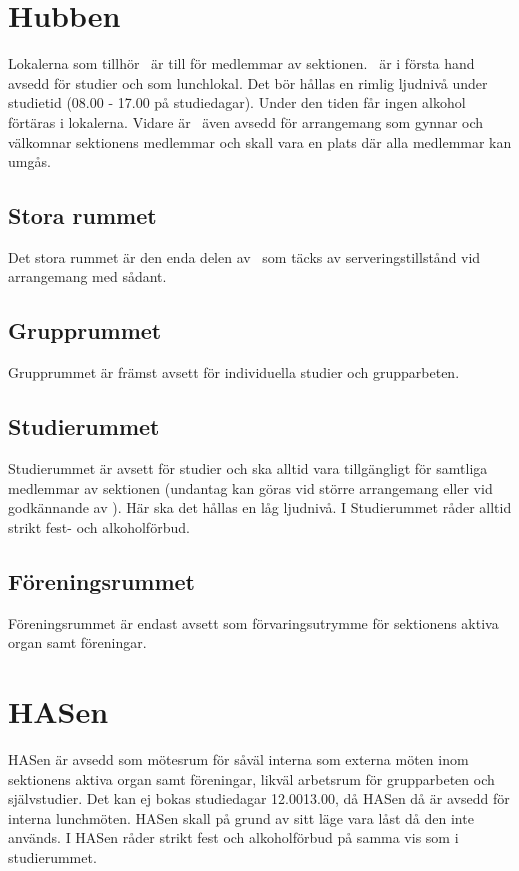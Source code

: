 \documentclass[11pt, includeaddress]{classes/cthit}
\begin{document}
\section{Hubben}
Lokalerna som tillhör \HUBBEN\ är till för medlemmar av sektionen. \HUBBEN\ är i första hand avsedd för
studier och som lunchlokal. Det bör hållas en rimlig ljudnivå under studietid (08.00­ - 17.00 på
studiedagar). Under den tiden får ingen alkohol förtäras i lokalerna. Vidare är \HUBBEN\ även avsedd för
arrangemang som gynnar och välkomnar sektionens medlemmar och skall vara en plats där alla
medlemmar kan umgås.

\subsection{Stora rummet}
Det stora rummet är den enda delen av \HUBBEN\ som täcks av serveringstillstånd vid arrangemang med
sådant.

\subsection{Grupprummet}
Grupprummet är främst avsett för individuella studier och grupparbeten.

\subsection{Studierummet}
Studierummet är avsett för studier och ska alltid vara tillgängligt för samtliga medlemmar av sektionen (undantag kan göras vid större arrangemang eller vid godkännande av \STYRIT). Här ska det hållas en låg ljudnivå.
\newline
I Studierummet råder alltid strikt fest- och alkoholförbud.

\subsection{Föreningsrummet}
Föreningsrummet är endast avsett som förvaringsutrymme för sektionens aktiva organ samt föreningar.


\section{HASen}
HASen är avsedd som mötesrum för såväl interna som externa möten inom sektionens aktiva organ
samt föreningar, likväl arbetsrum för grupparbeten och självstudier. Det kan ej bokas studiedagar
12.00­13.00, då HASen då är avsedd för interna lunchmöten. HASen skall på grund av sitt läge vara
låst då den inte används.
\newline
I HASen råder strikt fest­ och alkoholförbud på samma vis som i studierummet.
\end{document}
